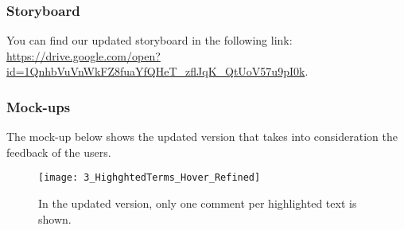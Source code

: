 \subsubsection{Storyboard}

You can find our updated storyboard in the following link: 
\url{https://drive.google.com/open?id=1QnhbVuVnWkFZ8fuaYfQHeT_zflJqK_QtUoV57u9pI0k}.

\subsubsection{Mock-ups}

The mock-up below shows the updated version that takes into consideration the 
feedback of the users.
 
\begin{figure}[H]
\centering
\texttt{[image: 3\_HighghtedTerms\_Hover\_Refined]}
\caption{In the updated version, only one comment per highlighted text is shown.}
\end{figure}

